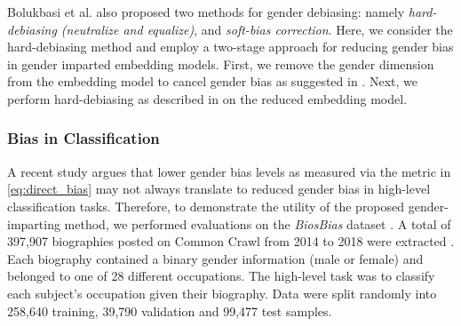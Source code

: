 \documentclass[11pt,a4paper]{article}
\begin{document}
Bolukbasi et al. \citep{bolukbasi16debiasing} also proposed two methods for gender debiasing: namely \textit{hard-debiasing (neutralize and equalize)}, and \textit{soft-bias correction}. Here, we consider the hard-debiasing method and employ a two-stage approach for reducing gender bias in gender imparted embedding models. First, we remove the gender dimension from the embedding model to cancel gender bias as suggested in \citep{dufter19ultraDense}. Next, we perform hard-debiasing as described in \citep{bolukbasi16debiasing} on the reduced embedding model.

\subsubsection{Bias in Classification}

A recent study \citep{prost19biasTextClassif} argues that lower gender bias levels as measured via the metric in \eqref{eq:direct_bias} may not always translate to reduced gender bias in high-level classification tasks. Therefore, to demonstrate the utility of the proposed gender-imparting method, we performed evaluations on the \textit{BiosBias} dataset \citep{de19biosbias}. A total of 397,907 biographies posted on Common Crawl from 2014 to 2018 were extracted \citep{de19biosbias}. Each biography contained a binary gender information (male or female) and belonged to one of 28 different occupations. The high-level task was to classify each subject's occupation given their biography. Data were split randomly into 258,640 training, 39,790 validation and 99,477 test samples.
\end{document}
